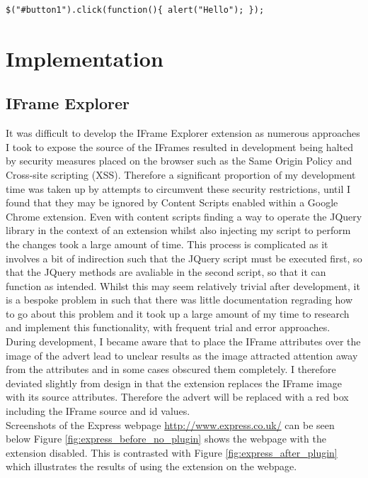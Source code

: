 \documentclass[12pt]{article}
\begin{document}
\begin{lstlisting}[caption=Setting the onClick functionality of button in JQuery, label={jqExample}]
$("#button1").click(function(){ alert("Hello"); });
\end{lstlisting}

\pagebreak

\section{Implementation}

\subsection{IFrame Explorer}
It was difficult to develop the IFrame Explorer extension as numerous approaches I took to expose the source of the IFrames resulted in development being halted by security measures placed on the browser such as the Same Origin Policy and Cross-site scripting (XSS). Therefore a significant proportion of my development time was taken up by attempts to circumvent these security restrictions, until I found that they may be ignored by Content Scripts enabled within a Google Chrome extension. Even with content scripts finding a way to operate the JQuery library in the context of an extension whilst also injecting my script to perform the changes took a large amount of time. This process is complicated as it involves a bit of indirection such that the JQuery script must be executed first, so that the JQuery methods are avaliable in the second script, so that it can function as intended. Whilst this may seem relatively trivial after development, it is a bespoke problem in such that there was little documentation regrading how to go about this problem and it took up a large amount of my time to research and implement this functionality, with frequent trial and error approaches. \\

During development, I became aware that to place the IFrame attributes over the image of the advert lead to unclear results as the image attracted attention away from the attributes and in some cases obscured them completely. I therefore deviated slightly from design in that the extension replaces the IFrame image with its source attributes. Therefore the advert will be replaced with a red box including the IFrame source and id values. \\

Screenshots of the Express webpage \url{http://www.express.co.uk/} can be seen below Figure \ref{fig:express_before_no_plugin} shows the webpage with the extension disabled. This is contrasted with Figure \ref{fig:express_after_plugin} which illustrates the results of using the extension on the webpage. 
\end{document}

